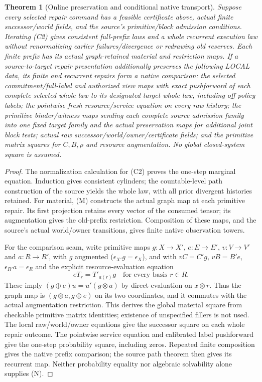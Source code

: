 \documentclass[11pt]{article}
\newtheorem{theorem}{Theorem}\newtheorem{proposition}{Proposition}
\begin{document}
\begin{theorem}[Online preservation and conditional native transport]\label{thm:online}
Suppose every selected repair command has a feasible certificate above, actual finite successor/world fields, and the source's primitive/block admission conditions. Iterating (C2) gives consistent full-prefix laws and a whole recurrent execution law without renormalizing earlier failures/divergence or redrawing old reserves. Each finite prefix has its actual graph-retained material and restriction maps. If a source-to-target repair presentation additionally preserves the following LOCAL data, its finite and recurrent repairs form a native comparison: the selected commitment/full-label and authorized view maps with exact pushforward of each complete selected whole law to its designated target whole law, including off-policy labels; the pointwise fresh resource/service equation on every raw history; the primitive binder/witness maps sending each complete source admission family into one fixed target family and the actual preservation maps for additional joint block tests; actual raw successor/world/owner/certificate fields; and the primitive matrix squares for $C,B,\rho$ and resource augmentation. No global closed-system square is assumed.
\end{theorem}
\begin{proof}
The normalization calculation for (C2) proves the one-step marginal equation. Induction gives consistent cylinders; the countable-level path construction of the source yields the whole law, with all prior divergent histories retained. For material, (M) constructs the actual graph map at each primitive repair. Its first projection retains every vector of the consumed tensor; its augmentation gives the old-prefix restriction. Composition of these maps, and the source's actual world/owner transitions, gives finite native observation towers.

For the comparison seam, write primitive maps $g:X\to X'$, $e:E\to E'$, $v:V\to V'$ and $a:R\to R'$, with $g$ augmented ($\epsilon_{X'}g=\epsilon_X$), and with $vC=C'g$, $vB=B'e$, $\epsilon_{R'}a=\epsilon_R$ and the explicit resource-evaluation equation
\[
 eT_r=T'_{a(r)}g\quad\text{for every basis }r\in R.
\tag{N}
\]
These imply $(g\oplus e)u=u'(g\otimes a)$ by direct evaluation on $x\otimes r$. Thus the graph map is $(g\otimes a,g\oplus e)$ on its two coordinates, and it commutes with the actual augmentation restriction. This derives the global material square from checkable primitive matrix identities; existence of unspecified fillers is not used. The local raw/world/owner equations give the successor square on each whole repair outcome. The pointwise service equation and calibrated label pushforward give the one-step probability square, including zeros. Repeated finite composition gives the native prefix comparison; the source path theorem then gives its recurrent map. Neither probability equality nor algebraic solvability alone supplies (N).
\end{proof}
\end{document}
